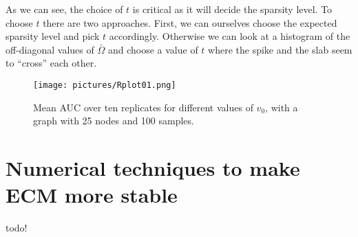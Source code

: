 \documentclass[a4paper, 11pt, oneside]{report}
\newcommand{\1}{\mathds{1}}
\begin{document}
As we can see, the choice of $t$ is critical as it will decide the sparsity level.
To choose $t$ there are two approaches. First, we can ourselves choose the
expected sparsity level and pick $t$ accordingly. Otherwise we can look at a
histogram of the off-diagonal values of $\bar \Omega$ and choose a value of $t$
where the spike and the slab seem to ``cross'' each other.

\begin{figure}
	\centering
	\texttt{[image: pictures/Rplot01.png]}
	\caption{Mean AUC over ten replicates for different values of $v_0$, with a
		graph with 25 nodes and 100 samples.}\label{fig:mean_auc}
\end{figure}

\chapter{Numerical techniques to make ECM more stable}
todo!
\end{document}
